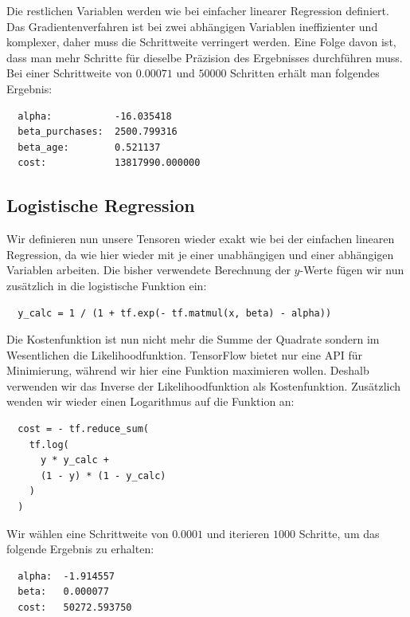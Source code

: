 Die restlichen Variablen werden wie bei einfacher linearer Regression definiert. Das Gradientenverfahren ist bei zwei abhängigen Variablen ineffizienter und komplexer, daher muss die Schrittweite verringert werden. Eine Folge davon ist, dass man mehr Schritte für dieselbe Präzision des Ergebnisses durchführen muss. Bei einer Schrittweite von $0.00071$ und $50000$ Schritten erhält man folgendes Ergebnis:

\begin{verbatim}
  alpha:           -16.035418
  beta_purchases:  2500.799316
  beta_age:        0.521137
  cost:            13817990.000000
\end{verbatim}

\subsection{Logistische Regression}

Wir definieren nun unsere Tensoren wieder exakt wie bei der einfachen linearen Regression, da wie hier wieder mit je einer unabhängigen und einer abhängigen Variablen arbeiten. Die bisher verwendete Berechnung der $y$-Werte fügen wir nun zusätzlich in die logistische Funktion ein:

\begin{verbatim}
  y_calc = 1 / (1 + tf.exp(- tf.matmul(x, beta) - alpha))
\end{verbatim}

Die Kostenfunktion ist nun nicht mehr die Summe der Quadrate sondern im Wesentlichen die Likelihoodfunktion. TensorFlow bietet nur eine API für Minimierung, während wir hier eine Funktion maximieren wollen. Deshalb verwenden wir das Inverse der Likelihoodfunktion als Kostenfunktion. Zusätzlich wenden wir wieder einen Logarithmus auf die Funktion an:

\begin{verbatim}
  cost = - tf.reduce_sum(
    tf.log(
      y * y_calc +
      (1 - y) * (1 - y_calc)
    )
  )
\end{verbatim}

Wir wählen eine Schrittweite von $0.0001$ und iterieren $1000$ Schritte, um das folgende Ergebnis zu erhalten:

\begin{verbatim}
  alpha:  -1.914557
  beta:   0.000077
  cost:   50272.593750
\end{verbatim}

